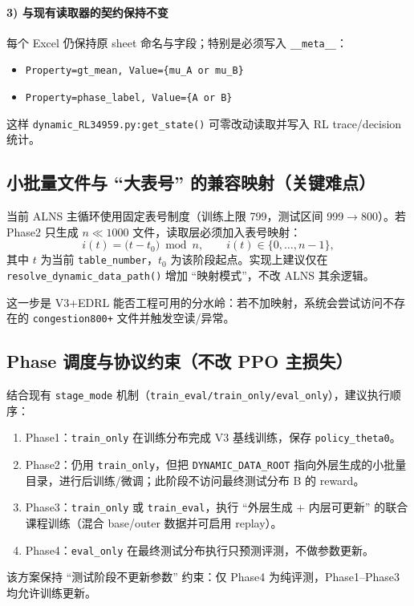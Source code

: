 \documentclass[UTF8,11pt,a4paper]{ctexart}
\begin{document}
\paragraph{3) 与现有读取器的契约保持不变}
每个 Excel 仍保持原 sheet 命名与字段；特别是必须写入 \texttt{\_\_meta\_\_}：
\begin{itemize}
\item \texttt{Property=gt\_mean, Value=\{mu\_A or mu\_B\}}
\item \texttt{Property=phase\_label, Value=\{A or B\}}
\end{itemize}
这样 \texttt{dynamic\_RL34959.py:get\_state()} 可零改动读取并写入 RL trace/decision 统计。

\subsection{小批量文件与 ``大表号'' 的兼容映射（关键难点）}
当前 ALNS 主循环使用固定表号制度（训练上限 799，测试区间 999$\rightarrow$800）。若 Phase2 只生成 $n\ll1000$ 文件，读取层必须加入表号映射：
\begin{equation}
i(t)=\big(t-t_0\big)\bmod n,\qquad i(t)\in\{0,\dots,n-1\},
\end{equation}
其中 $t$ 为当前 \texttt{table\_number}，$t_0$ 为该阶段起点。实现上建议仅在 \texttt{resolve\_dynamic\_data\_path()} 增加 ``映射模式''，不改 ALNS 其余逻辑。

这一步是 V3+EDRL 能否工程可用的分水岭：若不加映射，系统会尝试访问不存在的 \texttt{congestion800+} 文件并触发空读/异常。

\subsection{Phase 调度与协议约束（不改 PPO 主损失）}
结合现有 \texttt{stage\_mode} 机制（\texttt{train\_eval/train\_only/eval\_only}），建议执行顺序：
\begin{enumerate}
\item Phase1：\texttt{train\_only} 在训练分布完成 V3 基线训练，保存 \texttt{policy\_theta0}。
\item Phase2：仍用 \texttt{train\_only}，但把 \texttt{DYNAMIC\_DATA\_ROOT} 指向外层生成的小批量目录，进行后训练/微调；此阶段不访问最终测试分布 B 的 reward。
\item Phase3：\texttt{train\_only} 或 \texttt{train\_eval}，执行 ``外层生成 + 内层可更新'' 的联合课程训练（混合 base/outer 数据并可启用 replay）。
\item Phase4：\texttt{eval\_only} 在最终测试分布执行只预测评测，不做参数更新。
\end{enumerate}
该方案保持 ``测试阶段不更新参数'' 约束：仅 Phase4 为纯评测，Phase1--Phase3 均允许训练更新。
\end{document}

